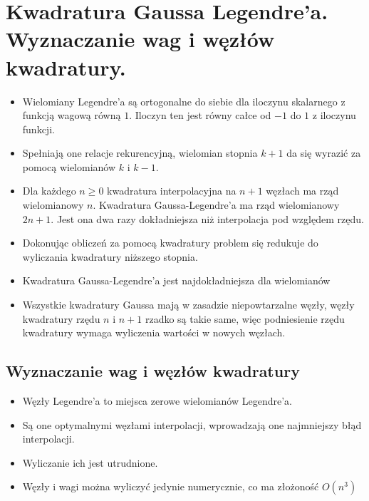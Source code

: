 \documentclass[a4paper]{article}
\begin{document}
\section{Kwadratura Gaussa Legendre'a. Wyznaczanie wag i węzłów kwadratury.}
\begin{itemize}
    \item Wielomiany Legendre'a są ortogonalne do siebie dla iloczynu skalarnego z funkcją wagową równą $1$. Iloczyn ten jest równy całce od $-1$ do $1$ z iloczynu funkcji.
    \item Spełniają one relacje rekurencyjną, wielomian stopnia $k+1$ da się wyrazić za pomocą wielomianów $k$ i $k-1$.
    \item Dla każdego $n \geq 0$ kwadratura interpolacyjna na $n + 1$ węzłach ma rząd wielomianowy $n$. Kwadratura Gaussa-Legendre’a ma rząd wielomianowy $2n + 1$. Jest ona dwa razy dokładniejsza niż interpolacja pod względem rzędu.
    \item Dokonując obliczeń za pomocą kwadratury problem się redukuje do wyliczania kwadratury niższego stopnia.
    \item Kwadratura Gaussa-Legendre’a jest najdokładniejsza dla wielomianów
    \item Wszystkie kwadratury Gaussa mają w zasadzie niepowtarzalne węzły, węzły kwadratury rzędu $n$ i $n+1$ rzadko są takie same, więc podniesienie rzędu kwadratury wymaga wyliczenia wartości w nowych węzłach.
\end{itemize}

\subsection{Wyznaczanie wag i węzłów kwadratury}
\begin{itemize}
    \item Węzły Legendre'a to miejsca zerowe wielomianów Legendre'a.
    \item Są one optymalnymi węzłami interpolacji, wprowadzają one najmniejszy błąd interpolacji.
    \item Wyliczanie ich jest utrudnione.
    \item Węzły i wagi można wyliczyć jedynie numerycznie, co ma złożoność $O(n^3)$
\end{itemize}
\end{document}
